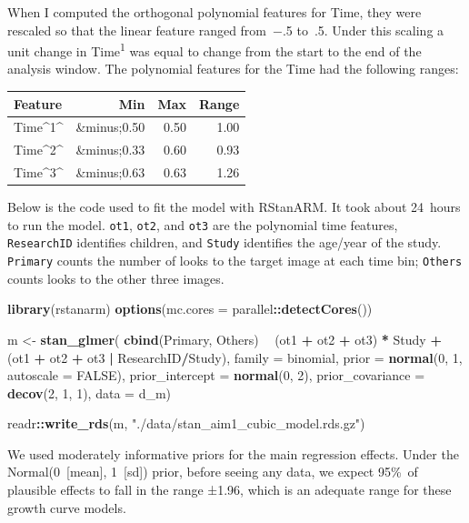 \documentclass [11pt, proquest] {uwthesis}[2015/03/03]
\newenvironment{Shaded}{}{}
\newcommand{\KeywordTok}[1]{\textcolor[rgb]{0.00,0.44,0.13}{\textbf{{#1}}}}
\newcommand{\DataTypeTok}[1]{\textcolor[rgb]{0.56,0.13,0.00}{{#1}}}
\newcommand{\DecValTok}[1]{\textcolor[rgb]{0.25,0.63,0.44}{{#1}}}
\newcommand{\StringTok}[1]{\textcolor[rgb]{0.25,0.44,0.63}{{#1}}}
\newcommand{\OtherTok}[1]{\textcolor[rgb]{0.00,0.44,0.13}{{#1}}}
\newcommand{\NormalTok}[1]{{#1}}
\newcommand{\OperatorTok}[1]{\textcolor[rgb]{0.00,0.44,0.13}{\textbf{{#1}}}}
\begin{document}
When I computed the orthogonal polynomial features for Time, they were
rescaled so that the linear feature ranged from~−.5 to~.5. Under this
scaling a unit change in Time\textsuperscript{1} was equal to change
from the start to the end of the analysis window. The polynomial
features for the Time had the following ranges:
\begin{tabular}{l|r|r|r}
\hline
Feature & Min & Max & Range\\
\hline
Time\textasciicircum{}1\textasciicircum{} & \&minus;0.50 & 0.50 & 1.00\\
\hline
Time\textasciicircum{}2\textasciicircum{} & \&minus;0.33 & 0.60 & 0.93\\
\hline
Time\textasciicircum{}3\textasciicircum{} & \&minus;0.63 & 0.63 & 1.26\\
\hline
\end{tabular}
Below is the code used to fit the model with RStanARM. It took about
24~hours to run the model. \texttt{ot1}, \texttt{ot2}, and \texttt{ot3}
are the polynomial time features, \texttt{ResearchID} identifies
children, and \texttt{Study} identifies the age/year of the study.
\texttt{Primary} counts the number of looks to the target image at each
time bin; \texttt{Others} counts looks to the other three images.
\begin{Shaded}
\begin{Highlighting}[]
\KeywordTok{library}\NormalTok{(rstanarm)}
\KeywordTok{options}\NormalTok{(}\DataTypeTok{mc.cores =}\NormalTok{ parallel}\OperatorTok{::}\KeywordTok{detectCores}\NormalTok{())}

\NormalTok{m <-}\StringTok{ }\KeywordTok{stan_glmer}\NormalTok{(}
  \KeywordTok{cbind}\NormalTok{(Primary, Others) }\OperatorTok{~}
\StringTok{    }\NormalTok{(ot1 }\OperatorTok{+}\StringTok{ }\NormalTok{ot2 }\OperatorTok{+}\StringTok{ }\NormalTok{ot3) }\OperatorTok{*}\StringTok{ }\NormalTok{Study }\OperatorTok{+}
\StringTok{    }\NormalTok{(ot1 }\OperatorTok{+}\StringTok{ }\NormalTok{ot2 }\OperatorTok{+}\StringTok{ }\NormalTok{ot3 }\OperatorTok{|}\StringTok{ }\NormalTok{ResearchID}\OperatorTok{/}\NormalTok{Study),}
  \DataTypeTok{family =}\NormalTok{ binomial,}
  \DataTypeTok{prior =} \KeywordTok{normal}\NormalTok{(}\DecValTok{0}\NormalTok{, }\DecValTok{1}\NormalTok{, }\DataTypeTok{autoscale =} \OtherTok{FALSE}\NormalTok{),}
  \DataTypeTok{prior_intercept =} \KeywordTok{normal}\NormalTok{(}\DecValTok{0}\NormalTok{, }\DecValTok{2}\NormalTok{),}
  \DataTypeTok{prior_covariance =} \KeywordTok{decov}\NormalTok{(}\DecValTok{2}\NormalTok{, }\DecValTok{1}\NormalTok{, }\DecValTok{1}\NormalTok{),}
  \DataTypeTok{data =}\NormalTok{ d_m)}

\NormalTok{readr}\OperatorTok{::}\KeywordTok{write_rds}\NormalTok{(m, }\StringTok{"./data/stan_aim1_cubic_model.rds.gz"}\NormalTok{)}
\end{Highlighting}
\end{Shaded}
We used moderately informative priors for the main regression effects.
Under the Normal(0~{[}mean{]}, 1~{[}sd{]}) prior, before seeing any
data, we expect 95\%~of plausible effects to fall in the range ±1.96,
which is an adequate range for these growth curve models.
\end{document}
